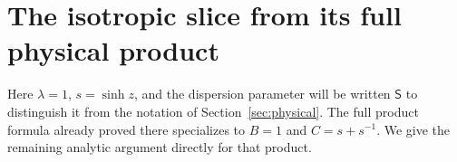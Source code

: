\documentclass[11pt]{article}
\numberwithin{equation}{section}
\theoremstyle{definition}
\begin{document}

\section{The isotropic slice from its full physical product}
\label{sec:iso-internal}

Here $\lambda=1$, $s=\sinh z$, and the dispersion parameter will be
written $\mathsf S$ to distinguish it from the notation of
Section~\ref{sec:physical}.  The full product formula already proved
there specializes to $B=1$ and $C=s+s^{-1}$.  We give the remaining
analytic argument directly for that product.
\end{document}
